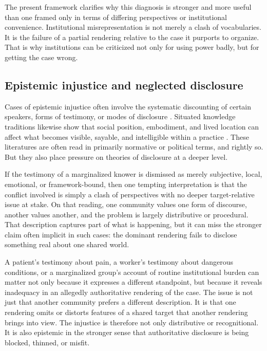 \documentclass[11pt]{article}
\begin{document}
The present framework clarifies why this diagnosis is stronger and more useful than one framed only in terms of differing perspectives or institutional convenience. Institutional misrepresentation is not merely a clash of vocabularies. It is the failure of a partial rendering relative to the case it purports to organize. That is why institutions can be criticized not only for using power badly, but for getting the case wrong.

\subsection{Epistemic injustice and neglected disclosure}

Cases of epistemic injustice often involve the systematic discounting of certain speakers, forms of testimony, or modes of disclosure \cite{Fricker2007EpistemicInjustice}. Situated knowledge traditions likewise show that social position, embodiment, and lived location can affect what becomes visible, sayable, and intelligible within a practice \cite{Haraway1988SituatedKnowledges}. These literatures are often read in primarily normative or political terms, and rightly so. But they also place pressure on theories of disclosure at a deeper level.

If the testimony of a marginalized knower is dismissed as merely subjective, local, emotional, or framework-bound, then one tempting interpretation is that the conflict involved is simply a clash of perspectives with no deeper target-relative issue at stake. On that reading, one community values one form of discourse, another values another, and the problem is largely distributive or procedural. That description captures part of what is happening, but it can miss the stronger claim often implicit in such cases: the dominant rendering fails to disclose something real about one shared world.

A patient's testimony about pain, a worker's testimony about dangerous conditions, or a marginalized group's account of routine institutional burden can matter not only because it expresses a different standpoint, but because it reveals inadequacy in an allegedly authoritative rendering of the case. The issue is not just that another community prefers a different description. It is that one rendering omits or distorts features of a shared target that another rendering brings into view. The injustice is therefore not only distributive or recognitional. It is also epistemic in the stronger sense that authoritative disclosure is being blocked, thinned, or misfit.
\end{document}

